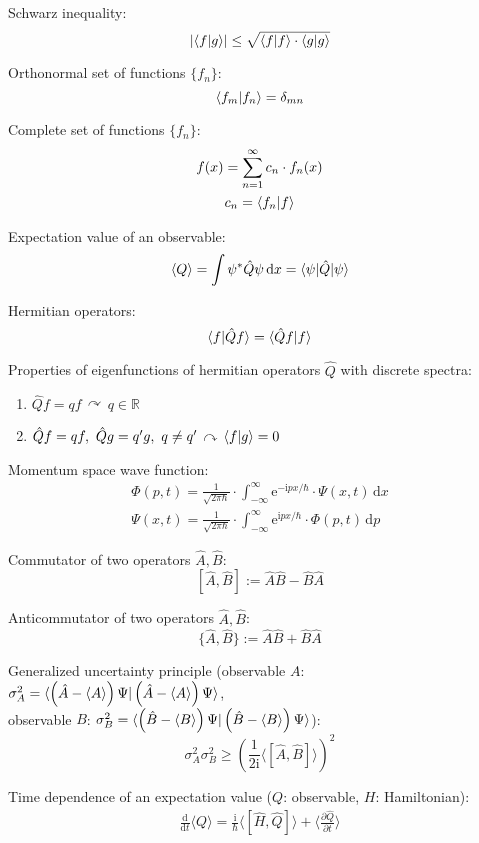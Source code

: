 \documentclass[fontsize=11pt,a4paper]{scrartcl}
\begin{document}
Schwarz inequality:
\[
	\left|\braket{f|g}\right| \le \sqrt{\braket{f|f}\cdot\braket{g|g}}
\]

Orthonormal set of functions $\{f_n\}$:
\[
	\braket{f_m|f_n} = \delta_{mn}
\]

Complete set of functions $\{f_n\}$:
\begin{gather*}
	f(x)=\sum_{n=1}^\infty c_n\cdot f_n(x)\\
	c_n=\braket{f_n|f}
\end{gather*}

Expectation value of an observable:
\[
	\langle Q\rangle=\int \psi^*\hat Q\psi\,\mathrm{d}x=\braket{\psi|\hat Q|\psi}
\]

Hermitian operators:
\[
	\braket{f|\hat Q f}=\braket{\hat Qf|f}
\]

Properties of eigenfunctions of hermitian operators $\hat Q$ with discrete spectra:
\begin{enumerate}
	\item $\hat Q f=qf\,\curvearrowright\,q\in\mathbb{R}$
	\item $\hat Q f=qf,\,\, \hat Q g=q'g,\,\,q\neq q'\,\curvearrowright\,\braket{f|g}=0$
\end{enumerate}

Momentum space wave function:
\begin{gather*}
	\Phi(p,t)=\frac{1}{\sqrt{2\pi\hbar}}\cdot\int_{-\infty}^\infty \mathrm{e}^{-\mathrm{i}px/\hbar}
		\cdot\Psi(x, t)\,\mathrm{d}x\\
	\Psi(x,t)=\frac{1}{\sqrt{2\pi\hbar}}\cdot\int_{-\infty}^\infty \mathrm{e}^{\mathrm{i}px/\hbar}
		\cdot\Phi(p,t)\,\mathrm{d}p
\end{gather*}

Commutator of two operators $\hat A, \hat B$:
\[
	[\hat A, \hat B]:=\hat A\hat B - \hat B\hat A
\]

Anticommutator of two operators $\hat A, \hat B$:
\[
	\{\hat A, \hat B\}:=\hat A\hat B + \hat B\hat A
\]

Generalized uncertainty principle (observable $A$: $\sigma_A^2=\braket{\left(\hat A-\langle A\rangle\right)\Psi|\left(\hat A-\langle A\rangle\right)\Psi}$,\\ observable $B$: $\sigma_B^2=\braket{\left(\hat B-\langle B\rangle\right)\Psi|\left(\hat B-\langle B\rangle\right)\Psi}$):
\[
	\sigma_A^2\sigma_B^2\ge\left(\frac{1}{2\mathrm{i}} \langle [\hat A,\hat B]\rangle\right)^2
\]

Time dependence of an expectation value ($Q$: observable, $H$: Hamiltonian):
\begin{gather*}
	\frac{\mathrm{d}}{\mathrm{d}t}\langle Q\rangle=
		\frac{\mathrm{i}}{\hbar}\langle[\hat H,\hat Q]\rangle+\langle\frac{\partial\hat Q}{\partial t}\rangle
\end{gather*}
\end{document}
